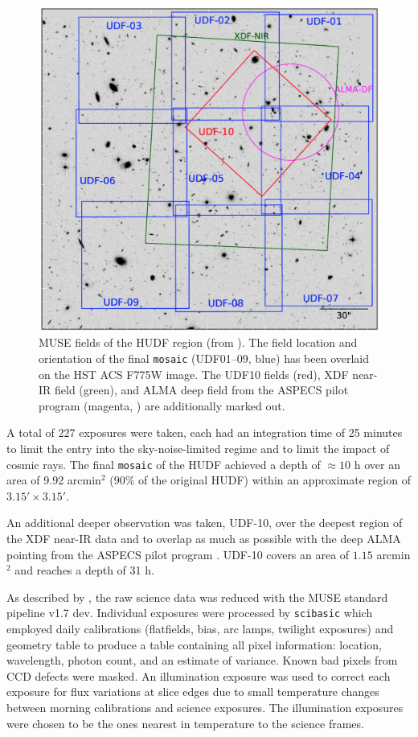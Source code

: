 \documentclass[12pt, twocolumn, nofootinbib]{revtex4-1}    %
\begin{document}
\begin{figure}
\includegraphics[width=\linewidth]{introduction/muse_frame}
\caption[MUSE HUDF]{MUSE fields of the HUDF region (from \cite{2017A&A...608A...1B}). The field location and orientation of the final \texttt{mosaic} (UDF01--09, blue) has been overlaid on the HST ACS F775W image. The UDF10 fields (red), XDF near-IR field (green), and ALMA deep field from the ASPECS pilot program (magenta, \citealt{2016ApJ...833...67W}) are additionally marked out.}
\label{fig:muse_frame}
\end{figure}

A total of 227 exposures were taken, each had an integration time of 25 minutes to limit the entry into the sky-noise-limited regime and to limit the impact of cosmic rays. The final \texttt{mosaic} of the HUDF achieved a depth of $\approx10$ h over an area of 9.92 arcmin$^2$ ($90\%$ of the original HUDF) within an approximate region of $3.15'\times3.15'$. 

An additional deeper observation was taken, UDF-10, over the deepest region of the XDF near-IR data and to overlap as much as possible with the deep ALMA pointing from the ASPECS pilot program \citep{2016ApJ...833...67W}. UDF-10 covers an area of $1.15$ arcmin$^2$ and reaches a depth of 31 h.

As described by \cite{2017A&A...608A...1B}, the raw science data was reduced with the MUSE standard pipeline v1.7 dev. Individual exposures were processed by \texttt{scibasic} which employed daily calibrations (flatfields, bias, arc lamps, twilight exposures) and geometry table to produce a table containing all pixel information: location, wavelength, photon count, and an estimate of variance. Known bad pixels from CCD defects were masked. An illumination exposure was used to correct each exposure for flux variations at slice edges due to small temperature changes between morning calibrations and science exposures. The illumination exposures were chosen to be the ones nearest in temperature to the science frames.
\end{document}
